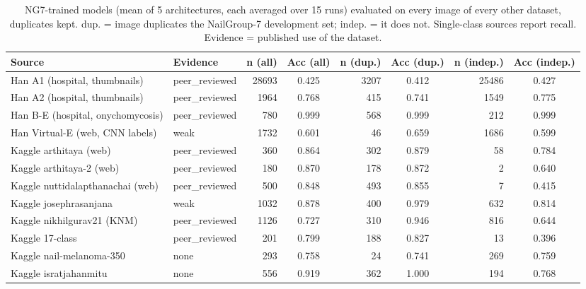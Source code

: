 \begin{table}[!tbp]
\centering
\caption{NG7-trained models (mean of 5 architectures, each averaged over 15 runs) evaluated on every image of every other dataset, duplicates kept. dup. = image duplicates the NailGroup-7 development set; indep. = it does not. Single-class sources report recall. Evidence = published use of the dataset.}
\label{tab:fullsources}
\footnotesize
\begin{tabular}{llrcrcrc}
\hline
Source & Evidence & n (all) & Acc (all) & n (dup.) & Acc (dup.) & n (indep.) & Acc (indep.) \\
\hline
Han A1 (hospital, thumbnails) & peer\_reviewed & 28693 & 0.425 & 3207 & 0.412 & 25486 & 0.427 \\
Han A2 (hospital, thumbnails) & peer\_reviewed & 1964 & 0.768 & 415 & 0.741 & 1549 & 0.775 \\
Han B-E (hospital, onychomycosis) & peer\_reviewed & 780 & 0.999 & 568 & 0.999 & 212 & 0.999 \\
Han Virtual-E (web, CNN labels) & weak & 1732 & 0.601 & 46 & 0.659 & 1686 & 0.599 \\
Kaggle arthitaya (web) & peer\_reviewed & 360 & 0.864 & 302 & 0.879 & 58 & 0.784 \\
Kaggle arthitaya-2 (web) & peer\_reviewed & 180 & 0.870 & 178 & 0.872 & 2 & 0.640 \\
Kaggle nuttidalapthanachai (web) & peer\_reviewed & 500 & 0.848 & 493 & 0.855 & 7 & 0.415 \\
Kaggle josephrasanjana & weak & 1032 & 0.878 & 400 & 0.979 & 632 & 0.814 \\
Kaggle nikhilgurav21 (KNM) & peer\_reviewed & 1126 & 0.727 & 310 & 0.946 & 816 & 0.644 \\
Kaggle 17-class & peer\_reviewed & 201 & 0.799 & 188 & 0.827 & 13 & 0.396 \\
Kaggle nail-melanoma-350 & none & 293 & 0.758 & 24 & 0.741 & 269 & 0.759 \\
Kaggle isratjahanmitu & none & 556 & 0.919 & 362 & 1.000 & 194 & 0.768 \\
\hline
\end{tabular}
\end{table}